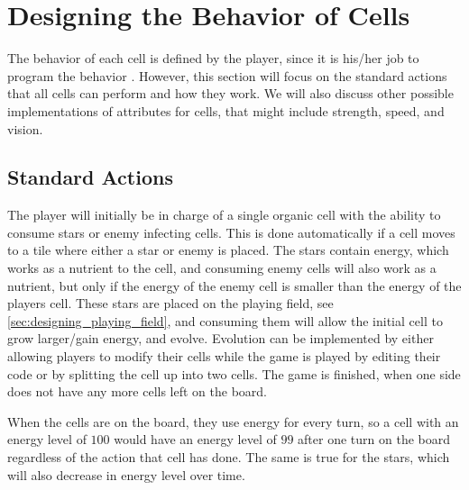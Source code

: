 \section{Designing the Behavior of Cells}
\label{sec:designingBehaviorCells}

The behavior of each cell is defined by the player, since it is his/her job to program the behavior .
However, this section will focus on the standard actions that all cells can perform and how they work.
We will also discuss other possible implementations of attributes for cells, that might include strength, speed, and vision.

\subsection{Standard Actions}

The player will initially be in charge of a single organic cell with the ability to consume stars or enemy infecting cells.
This is done automatically if a cell moves to a tile where either a star or enemy is placed.
The stars contain energy, which works as a nutrient to the cell, and consuming enemy cells will also work as a nutrient, but only if the energy of the enemy cell is smaller than the energy of the players cell.
These stars are placed on the playing field, see \autoref{sec:designing_playing_field}, and consuming them will allow the initial cell to grow larger/gain energy, and evolve.
Evolution can be implemented by either allowing players to modify their cells while the game is played by editing their code or by splitting the cell up into two cells.
The game is finished, when one side does not have any more cells left on the board.\newline

When the cells are on the board, they use energy for every turn, so a cell with an energy level of $100$ would have an energy level of $99$ after one turn on the board regardless of the action that cell has done. The same is true for the stars, which will also decrease in energy level over time.\newline

